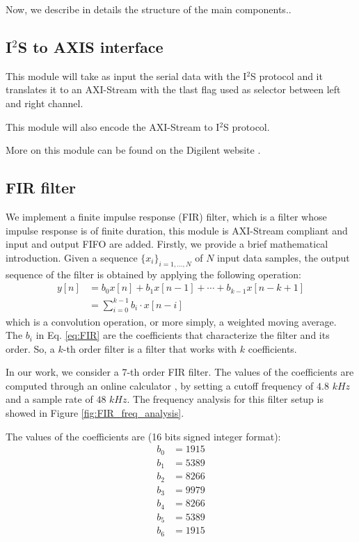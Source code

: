 \documentclass[11pt, a4paper]{article}
\begin{document}
Now, we describe in details the structure of the main components..

\subsection{I$^2$S to AXIS interface}
This module will take as input the serial data with the I$^2$S protocol and it translates it to an AXI-Stream with the tlast flag used as selector between left and right channel.  

This module will also encode the AXI-Stream to I$^2$S protocol.  

More on this module can be found on the Digilent website \cite{Digilent}. 

\subsection{FIR filter}
We implement a finite impulse response (FIR) filter, which is a filter whose impulse response is of finite duration, this module is AXI-Stream compliant and input and output FIFO are added.
Firstly, we provide a brief mathematical introduction. Given a sequence $\{x_i\}_{i=1,\dots,N}$ of $N$ input data samples, the output sequence of the filter is obtained by applying the following operation:
\begin{equation}
    \begin{aligned}
        y[n] &=b_{0} x[n]+b_{1} x[n-1]+\cdots+b_{k-1} x[n-k+1] \\
        &=\sum_{i=0}^{k-1} b_{i} \cdot x[n-i]
    \end{aligned}
    \label{eq:FIR}
\end{equation}
which is a convolution operation, or more simply, a weighted moving average. The $b_i$ in Eq. \ref{eq:FIR} are the coefficients that characterize the filter and its order. So, a $k$-th order filter is a filter that works with $k$ coefficients.  

In our work, we consider a 7-th order FIR filter. The values of the coefficients are computed through an online calculator %
, by setting a cutoff frequency of $4.8$ $kHz$ and a sample rate of $48$ $kHz$. The frequency analysis for this filter setup is showed in Figure \ref{fig:FIR_freq_analysis}.


The values of the coefficients are (16 bits signed integer format):
\begin{align*}
    b_0 &= 1915  \\
    b_1 &= 5389  \\
    b_2 &= 8266  \\
    b_3 &= 9979  \\
    b_4 &= 8266  \\
    b_5 &= 5389  \\
    b_6 &= 1915
\end{align*}
\end{document}
